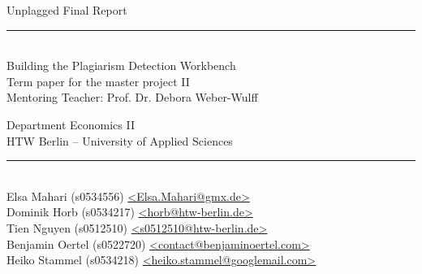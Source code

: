\begin{titlepage}
\vspace*{2cm}

\begin{center}
\Huge
Unplagged Final Report\\
\large
\vspace{0.5cm}
\rule[3mm]{1cm}{0.05mm}\\
Building the Plagiarism Detection Workbench\\
\normalsize
\vfill
Term paper for the master project II \\ Mentoring Teacher: Prof. Dr. Debora Weber-Wulff\\
\vfill

Department Economics II\\
HTW Berlin -- University of Applied Sciences\\

\rule{8.2cm}{0.2mm}\\
Elsa Mahari (s0534556) \href{mailto:elsa.mahari@gmx.de}{\textless Elsa.Mahari@gmx.de\textgreater}\\
Dominik Horb (s0534217) \href{mailto:horb@htw-berlin.de}{\textless horb@htw-berlin.de\textgreater}\\
Tien Nguyen (s0512510) \href{mailto:s0512510@htw-berlin.de}{\textless s0512510@htw-berlin.de\textgreater}\\
Benjamin Oertel (s0522720) \href{mailto:contact@benjaminoertel.com}{\textless contact@benjaminoertel.com\textgreater}\\
Heiko Stammel (s0534218) \href{mailto:heiko.stammel@googlemail.com}{\textless heiko.stammel@googlemail.com\textgreater}\\


\end{center}
\end{titlepage}